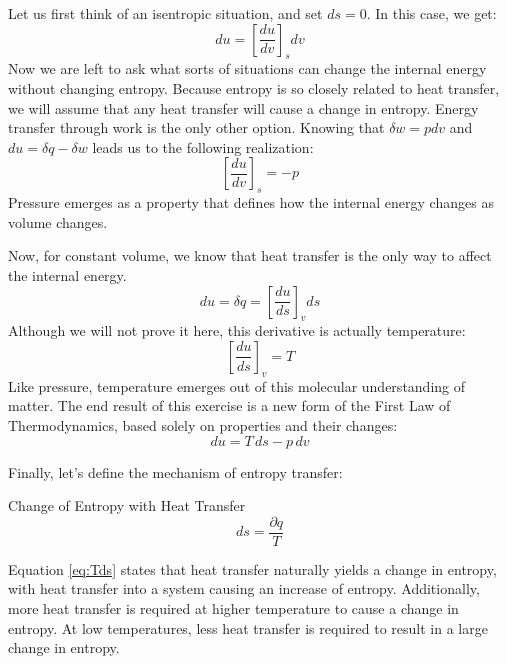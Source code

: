 Let us first think of an isentropic situation, and set $ds = 0$.  In this case, we get:
\begin{equation*}
  du = \left[\frac{d u}{d v}\right]_s dv
\end{equation*}
Now we are left to ask what sorts of situations can change the internal energy without changing entropy.  Because entropy is so closely related to heat transfer, we will assume that any heat transfer will cause a change in entropy.  Energy transfer through work is the only other option.  Knowing that $\delta w = p dv$ and $du = \delta q - \delta w$ leads us to the following realization:
\begin{equation} \label{eq:statMechPressure}
  \left[\frac{d u}{d v}\right]_s = -p
\end{equation}
Pressure emerges as a property that defines how the internal energy changes as volume changes.

Now, for constant volume, we know that heat transfer is the only way to affect the internal energy.
\begin{equation*}
  du = \delta q = \left[\frac{d u}{d s}\right]_v ds
\end{equation*}
Although we will not prove it here, this derivative is actually temperature:
\begin{equation} \label{eq:statMechPressure}
  \left[\frac{d u}{d s}\right]_v = T
\end{equation}
Like pressure, temperature emerges out of this molecular understanding of matter.  The end result of this exercise is a new form of the First Law of Thermodynamics, based solely on properties and their changes:
\begin{equation} \label{eq:FirstLawRevisited}
  du = T\,ds - p\,dv
\end{equation}

Finally, let's define the mechanism of entropy transfer:
\begin{quoteWithTitle}{Change of Entropy with Heat Transfer}
\begin{equation} \label{eq:Tds}
  ds = \frac{\partial q}{T}
\end{equation}
\end{quoteWithTitle}
Equation \ref{eq:Tds} states that heat transfer naturally yields a change in entropy, with heat transfer into a system causing an increase of entropy.
Additionally, more heat transfer is required at higher temperature to cause a change in entropy.  At low temperatures, less heat transfer is required to result in a large change in entropy.


